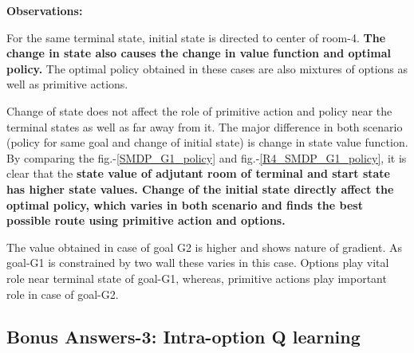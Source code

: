 \documentclass[preprint,12pt]{elsarticle}
\begin{document}
\textbf{Observations:}

For the same terminal state, initial state is directed to center of room-4. \textbf{The change in state also causes the change in value function and optimal policy.} The optimal policy obtained in these cases are also mixtures of options as well as primitive actions. 

Change of state does not affect the role of primitive action and policy near the terminal states as well as far away from it. The major difference in both scenario (policy for same goal and change of initial state) is change in state value function. By comparing the fig.-\ref{SMDP_G1_policy} and fig.-\ref{R4_SMDP_G1_policy}, it is clear that the \textbf{state value of adjutant room of terminal and start state has higher state values. Change of the initial state directly affect the optimal policy, which varies in both scenario and finds the best possible route using primitive action and options.}

 The value obtained in case of goal G2 is higher and shows nature of gradient. As goal-G1 is constrained by two wall these varies in this case. Options play vital role near terminal state of goal-G1, whereas, primitive actions play important role in case of goal-G2.
 
 \newpage

\subsection{Bonus Answers-3: Intra-option Q learning} 
\end{document}

